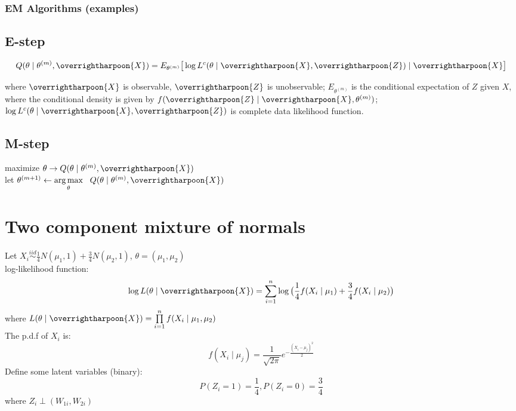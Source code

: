 \documentclass[
  14pt,
]{article}
\begin{document}
\hypertarget{em-algorithms-examples}{%
\subsubsection{EM Algorithms (examples)}\label{em-algorithms-examples}}

\hypertarget{e-step}{%
\subsection{E-step}\label{e-step}}

\[
Q(\theta\mid\theta^{(m)},\overrightharpoon{X})=E_{\theta^{(m)}}\big[\log L^c(\theta\mid\overrightharpoon{X},\overrightharpoon{Z})\mid\overrightharpoon{X}\big]
\]

where \(\overrightharpoon{X}\) is observable, \(\overrightharpoon{Z}\)
is unobservable; \(E_{\theta^{(m)}}\) is the conditional expectation of
\(Z\) given \(X\), where the conditional density is given by
\(f(\overrightharpoon{Z}\mid\overrightharpoon{X},\theta^{(m)})\);\\
\(\log L^c(\theta\mid\overrightharpoon{X},\overrightharpoon{Z})\) is
complete data likelihood function.

\hypertarget{m-step}{%
\subsection{M-step}\label{m-step}}

maximize \(\theta\to Q(\theta\mid\theta^{(m)},\overrightharpoon{X})\)\\
let
\(\theta^{(m+1)}\gets\mathop{\arg\max}\limits_{\theta}\ \ Q(\theta\mid\theta^{(m)},\overrightharpoon{X})\)

\hypertarget{two-component-mixture-of-normals}{%
\section{Two component mixture of
normals}\label{two-component-mixture-of-normals}}

Let
\(X_i\overset{iid}{\sim}\frac{1}{4}N(\mu_1,1)+\frac{3}{4}N(\mu_2,1)\),
\(\theta=(\mu_1,\mu_2)\)\\
log-likelihood function:
\[\log L(\theta\mid\overrightharpoon{X})=\sum\limits_{i=1}^{n}\log\big(\frac{1}{4}f(X_i\mid\mu_1)+\frac{3}{4}f(X_i\mid\mu_2)\big)\]
where
\(L(\theta\mid\overrightharpoon{X})=\prod\limits_{i=1}^{n}f(X_i\mid\mu_1,\mu_2)\)\\
The p.d.f of \(X_i\) is:\\
\[
f(X_i\mid \mu_j)=\frac{1}{\sqrt{2\pi}}e^{-\frac{(X_i-\mu_j)^2}{2}}
\] Define some latent variables (binary):\\
\[P(Z_i=1)=\frac{1}{4}, P(Z_i=0)=\frac{3}{4}\] where
\(Z_i\perp(W_{1i},W_{2i})\)
\end{document}
